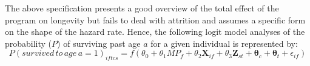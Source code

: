 The above specification presents a good overview of the total effect of the program on longevity but fails to deal with attrition and assumes a specific form on the shape of the hazard rate. Hence, the following logit model analyses of the probability ($P$) of surviving past age $a$ for a given individual is represented by:
$$
P(survived\,to\,age\,a=1)_{iftcs} = f(\theta_0 + \theta_1MP_f + \theta_2\mathbf{X}_{if} + \theta_3\mathbf{Z}_{st} + \mathbf{\theta}_c + \mathbf{\theta}_t + \epsilon_{if})
$$